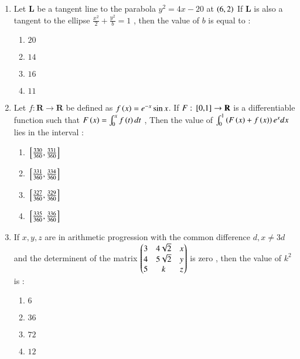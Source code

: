 \documentclass[journal,12pt,onecolumn]{IEEEtran}
\theoremstyle{remark}
\begin{document}
\begin{enumerate}
   \item Let $\mathbf{L}$ be a tangent line to the parabola $y^2 = 4x -20$ at $\left(6,2\right)$
   If $\mathbf{L}$ is also a tangent to the ellipse $\frac{x^2}{2} + \frac{y^2}{b} = 1$ , then the value of $b$ is equal to :
   \begin{multicols}{2}
       \begin{enumerate}
           \item $20$
           \item $14$
           \item $16$
           \item $11$\\
       \end{enumerate}
   \end{multicols}
   \item Let $f : \mathbf{R} \rightarrow \mathbf{R}$ be defined as $f\left(x\right) = e^{-x} \sin{x}$. If $F : {}\left[0 \text{,} 1\right] \rightarrow \mathbf{R}$ is a differentiable function such that $F\left(x\right) = \int_0^{x} f\left(t\right)dt$ , Then the value of $\int_0^1 \left(F\left(x\right)+f\left(x\right)\right)e^x dx$ lies in the interval : 
   \begin{multicols}{2}
       \begin{enumerate}
           \item ${}\left[\frac{330}{360}, \frac{331}{360}\right]$\\
           \item ${}\left[\frac{331}{360} , \frac{334}{360}\right]$
            \item ${}\left[\frac{327}{360}, \frac{329}{360}\right]$\\
             \item ${}\left[\frac{335}{360}, \frac{336}{360}\right]$
       \end{enumerate}
   \end{multicols}
   \item If $x , y, z$ are in arithmetic progression with the common difference $d , x \neq 3d$ and the determinent of the matrix $\begin{pmatrix} 3 & 4\sqrt{2} & x \\ 4 & 5\sqrt{2} & y \\ 5 &k &z\end{pmatrix}$ is zero , then the value of $k^2$ is : 
   \begin{multicols}{2}
       \begin{enumerate}
           \item $6$
           \item $36$\\
           \item $72$
           \item $12$

\end{enumerate}
\end{multicols}
\end{enumerate}
\end{document}
